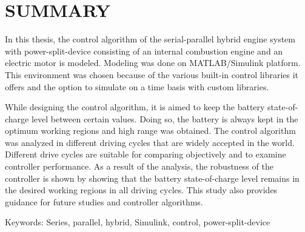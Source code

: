 \chapter{SUMMARY}

In this thesis, the control algorithm of the serial-parallel hybrid engine system with power-split-device consisting of an 
internal combustion engine and an electric motor is modeled. Modeling was done on MATLAB/Simulink platform. 
This environment was chosen because of the various built-in control libraries it offers and the option to simulate on a time
basis with custom libraries.

While designing the control algorithm, it is aimed to keep the battery state-of-charge level between certain values.
Doing so, the battery is always kept in the optimum working regions and high range was obtained.
The control algorithm was analyzed in different driving cycles that are widely accepted in the world. 
Different drive cycles are suitable for comparing objectively and to examine controller performance.
As a result of the analysis, the robustness of the controller is shown by showing that the battery 
state-of-charge level remains in the desired working regions in all driving cycles. This study also provides
guidance for future studies and controller algorithms.

Keywords: Series, parallel, hybrid, Simulink, control, power-split-device